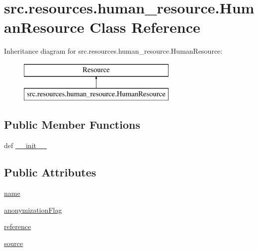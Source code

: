 \hypertarget{classsrc_1_1resources_1_1human__resource_1_1_human_resource}{\section{src.\+resources.\+human\+\_\+resource.\+Human\+Resource Class Reference}
\label{classsrc_1_1resources_1_1human__resource_1_1_human_resource}
}
Inheritance diagram for src.\+resources.\+human\+\_\+resource.\+Human\+Resource\+:\begin{figure}[H]
\begin{center}
\leavevmode
\includegraphics[height=2.000000cm]{classsrc_1_1resources_1_1human__resource_1_1_human_resource}
\end{center}
\end{figure}
\subsection*{Public Member Functions}
\begin{DoxyCompactItemize}
\item 
def \hyperlink{classsrc_1_1resources_1_1human__resource_1_1_human_resource_addeb94d9e7515701c687ddabbac2d41a}{\+\_\+\+\_\+init\+\_\+\+\_\+}
\end{DoxyCompactItemize}
\subsection*{Public Attributes}
\begin{DoxyCompactItemize}
\item 
\hyperlink{classsrc_1_1resources_1_1human__resource_1_1_human_resource_a73511a367ec14498cacc3fdb0cc77b22}{name}
\item 
\hyperlink{classsrc_1_1resources_1_1human__resource_1_1_human_resource_ad0af6551d89a2adfb08459104f46afcd}{anonymization\+Flag}
\item 
\hyperlink{classsrc_1_1resources_1_1human__resource_1_1_human_resource_a78c9919983d0f23160d8fe45732f139d}{reference}
\item 
\hyperlink{classsrc_1_1resources_1_1human__resource_1_1_human_resource_af7a5b2ee569964a16652fc96298ea6bd}{source}
\end{DoxyCompactItemize}


